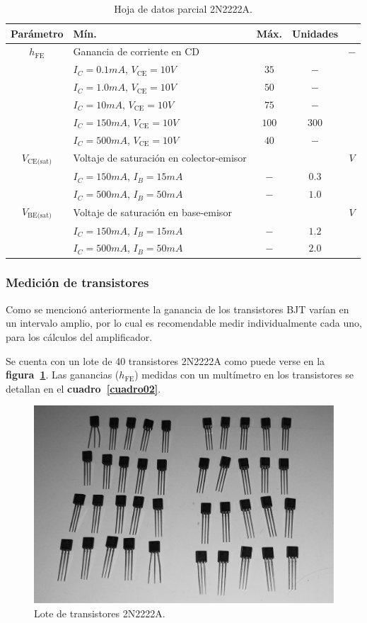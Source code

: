 \begin{table}[!ht]
\begin{center}
\begin{tabular}{|c|l|c|c|c|}
    \textbf{Parámetro} &
    \textbf{Mín.} &
    \textbf{Máx.} &
    \textbf{Unidades}
    \tabularnewline \hline \hline
    $h_{\text{FE}}$ &
    Ganancia de corriente en CD & & & $-$
    \tabularnewline
    & $I_C = 0.1mA,\,V_{\text{CE}} = 10V$ &  $35$ &   $-$ & \tabularnewline
    & $I_C = 1.0mA,\,V_{\text{CE}} = 10V$ &  $50$ &   $-$ & \tabularnewline
    & $I_C =  10mA,\,V_{\text{CE}} = 10V$ &  $75$ &   $-$ & \tabularnewline
    & $I_C = 150mA,\,V_{\text{CE}} = 10V$ & $100$ & $300$ & \tabularnewline
    & $I_C = 500mA,\,V_{\text{CE}} = 10V$ &  $40$ &   $-$ &
    \tabularnewline \hline
    $V_{\text{CE(sat)}}$ &
    Voltaje de saturación en colector-emisor & & & $V$
    \tabularnewline
    & $I_C = 150mA,\,I_B = 15mA$ & $-$ & $0.3$ & \tabularnewline
    & $I_C = 500mA,\,I_B = 50mA$ & $-$ & $1.0$ &
    \tabularnewline \hline
    $V_{\text{BE(sat)}}$ &
    Voltaje de saturación en base-emisor & & & $V$
    \tabularnewline
    & $I_C = 150mA,\,I_B = 15mA$ & $-$ & $1.2$ & \tabularnewline
    & $I_C = 500mA,\,I_B = 50mA$ & $-$ & $2.0$ &
    \tabularnewline \hline
    \end{tabular}
\end{center}
\caption{Hoja de datos parcial 2N2222A.}
\label{cuadro01}
\end{table}

\subsubsection{Medición de transistores}
Como se mencionó anteriormente la ganancia de los transistores BJT varían en un
intervalo amplio, por lo cual es recomendable medir individualmente cada uno,
para los cálculos del amplificador.

Se cuenta con un lote de 40 transistores 2N2222A como puede verse en la
\textbf{figura~\ref{figura04}}. Las ganancias ($h_{\text{FE}}$) medidas con un
multímetro en los transistores se detallan en el \textbf{cuadro~\ref{cuadro02}}.

\begin{figure}[!ht]
\centering
\includegraphics[scale=0.12]{diagramas/figura04.eps}
\caption{Lote de transistores 2N2222A.}
\label{figura04}
\end{figure}

